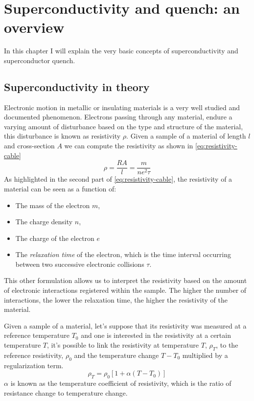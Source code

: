 \chapter{Superconductivity and quench: an overview}
\label{chp:soupcond-quench}
In this chapter I will explain the very basic concepts of superconductivity and
superconductor quench.
\section{Superconductivity in theory}
\label{sec:soupcond}
Electronic motion in metallic or insulating materials is a very well studied and documented
phenomenon. Electrons passing through any material, endure a varying amount of disturbance based on the type and structure of the material, this disturbance is known as resistivity $\rho$.
Given a sample of a material of length $l$ and cross-section $A$ we can compute the resistivity as
shown in \cref{eq:resistivity-cable}
\begin{equation}
	\label{eq:resistivity-cable}
	\rho = \frac{RA}{l} = \frac{m}{ne^2\tau}
\end{equation}
As highlighted in the second part of \cref{eq:resistivity-cable}, the resistivity of a
material can be seen as a function of:
\begin{itemize}
	\item The mass of the electron $m$,
	\item The charge density $n$,
	\item The charge of the electron $e$
	\item The \emph{relaxation time} of the electron, which is the time interval occurring between two
	      successive electronic collisions $\tau$.
\end{itemize}
This other formulation allows us to interpret the resistivity based on the amount of electronic
interactions registered within the sample. The higher the number of interactions, the lower the
relaxation time, the higher the resistivity of the material.

\medskip

Given a sample of a material, let's suppose that its resistivity was measured at a reference
temperature $T_0$ and one is interested in the resistivity at a certain temperature $T$, it's
possible to link the resistivity at temperature $T$, $\rho_T$, to the reference resistivity,
$\rho_0$ and the temperature change $T - T_0$ multiplied by a regularization term.
\begin{equation}
	\label{eq:resistivity-func-of-temp}
	\rho_T = \rho_0[1 + \alpha(T - T_0)]
\end{equation}
$\alpha$ is known as the temperature coefficient of resistivity, which is the ratio of resistance change to temperature change.

